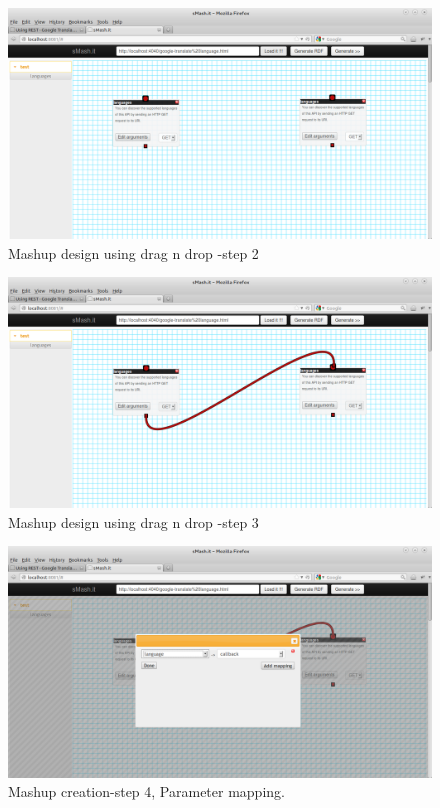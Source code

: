 \begin{spacing}{1.5}
\begin{figure}
        \centering
        \includegraphics[scale=0.3]{images/4.png}
        \caption{Mashup design using drag n drop -step 2}
\end{figure}


\begin{figure}
        \centering
        \includegraphics[scale=0.3]{images/3.png}
        \caption{Mashup design using drag n drop -step 3}
\end{figure}


\begin{figure}
        \centering
        \includegraphics[scale=0.3]{images/2.png}
        \caption{Mashup creation-step 4, Parameter mapping.}
\end{figure}


\end{spacing}
